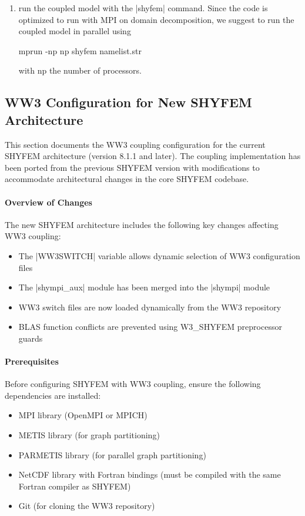\begin{enumerate}
\item run the coupled model with the |shyfem| command. Since the code
is optimized to run with MPI on domain decomposition, we suggest to
run the coupled model in parallel using
\begin{code}
mprun -np np shyfem namelist.str
\end{code}
with np the number of processors.

\end{enumerate}

\subsection{WW3 Configuration for New SHYFEM Architecture}

This section documents the WW3 coupling configuration for the current SHYFEM
architecture (version 8.1.1 and later). The coupling implementation has been
ported from the previous SHYFEM version with modifications to accommodate
architectural changes in the core SHYFEM codebase.

\paragraph{Overview of Changes}

The new SHYFEM architecture includes the following key changes affecting WW3 coupling:
\begin{itemize}
\item The |WW3SWITCH| variable allows dynamic selection of WW3 configuration files
\item The |shympi_aux| module has been merged into the |shympi| module
\item WW3 switch files are now loaded dynamically from the WW3 repository
\item BLAS function conflicts are prevented using W3\_SHYFEM preprocessor guards
\end{itemize}

\paragraph{Prerequisites}

Before configuring SHYFEM with WW3 coupling, ensure the following dependencies
are installed:
\begin{itemize}
\item MPI library (OpenMPI or MPICH)
\item METIS library (for graph partitioning)
\item PARMETIS library (for parallel graph partitioning)
\item NetCDF library with Fortran bindings (must be compiled with the same
Fortran compiler as SHYFEM)
\item Git (for cloning the WW3 repository)
\end{itemize}

